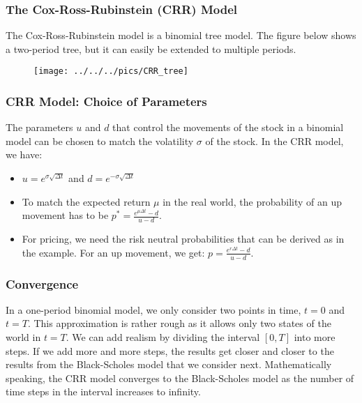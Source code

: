 \begin{frame}[fragile]
\frametitle{The Cox-Ross-Rubinstein (CRR) Model}
The Cox-Ross-Rubinstein model is a binomial tree model. The figure below shows a
two-period tree, but it can easily be extended to multiple periods.
\begin{figure}[htp]
\begin{center}
\texttt{[image: ../../../pics/CRR\_tree]}
\end{center}
\end{figure}
\end{frame}


\begin{frame}[fragile]
\frametitle{CRR Model: Choice of Parameters}
The parameters $u$ and $d$ that control the movements of the stock in a binomial
model can be chosen to match the volatility $\sigma$ of the stock. In the CRR
model, we have:
\begin{itemize}
  \item $u=e^{\sigma\sqrt{\Delta t}}$ and $d=e^{-\sigma\sqrt{\Delta t}}$
  \item To match the expected return $\mu$ in the real world, the probability of
  an up movement has to be $p^*=\frac{e^{\mu \Delta t} -d}{u-d}$.
  \item For pricing, we need the risk neutral probabilities that can be derived
  as in the example. For an up movement, we get: $p=\frac{e^{r \Delta t}
  -d}{u-d}$.
\end{itemize}
\end{frame}


\begin{frame}[fragile]
\frametitle{Convergence}
In a one-period binomial model, we only consider two points in time, $t=0$ and
$t=T$. This approximation is rather rough as it allows only two states of the
world in $t=T$. We can add realism by dividing the interval $[0,T]$ into more
steps. If we add more and more steps, the results get closer and closer to the
results from the Black-Scholes model that we consider next. Mathematically
speaking, the CRR model converges to the Black-Scholes model as the number of
time steps in the interval increases to infinity.
\end{frame}

